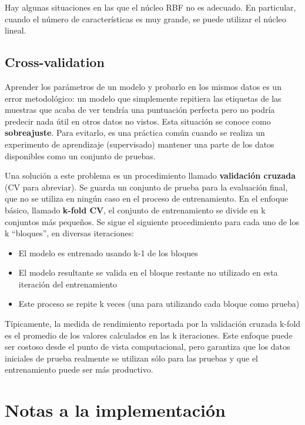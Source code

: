\documentclass[11pt]{article}
\providecommand{\tightlist}{%
      \setlength{\itemsep}{0pt}\setlength{\parskip}{0pt}}
\begin{document}
Hay algunas situaciones en las que el núcleo RBF no es adecuado. En
particular, cuando el número de características es muy grande, se puede
utilizar el núcleo lineal.

\subsection{Cross-validation}\label{cross-validation}

Aprender los parámetros de un modelo y probarlo en los mismos datos es
un error metodológico: un modelo que simplemente repitiera las etiquetas
de las muestras que acaba de ver tendría una puntuación perfecta pero no
podría predecir nada útil en otros datos no vistos. Esta situación se
conoce como \textbf{sobreajuste}. Para evitarlo, es una práctica común
cuando se realiza un experimento de aprendizaje (supervisado) mantener
una parte de los datos disponibles como un conjunto de pruebas.

Una solución a este problema es un procedimiento llamado
\textbf{validación cruzada} (CV para abreviar). Se guarda un conjunto de
prueba para la evaluación final, que no se utiliza en ningún caso en el
proceso de entrenamiento. En el enfoque básico, llamado \textbf{k-fold
CV}, el conjunto de entrenamiento se divide en k conjuntos más pequeños.
Se sigue el siguiente procedimiento para cada uno de los k ``bloques'',
en diversas iteraciones:

\begin{itemize}
\tightlist
\item
  El modelo es entrenado usando k-1 de los bloques
\item
  El modelo resultante se valida en el bloque restante no utilizado en
  esta iteración del entrenamiento
\item
  Este proceso se repite k veces (una para utilizando cada bloque como
  prueba)
\end{itemize}

Típicamente, la medida de rendimiento reportada por la validación
cruzada k-fold es el promedio de los valores calculados en las k
iteraciones. Este enfoque puede ser costoso desde el punto de vista
computacional, pero garantiza que los datos iniciales de prueba
realmente se utilizan sólo para las pruebas y que el entrenamiento puede
ser más productivo.

\section{Notas a la implementación}\label{notas-a-la-implementaciuxf3n}
\end{document}

